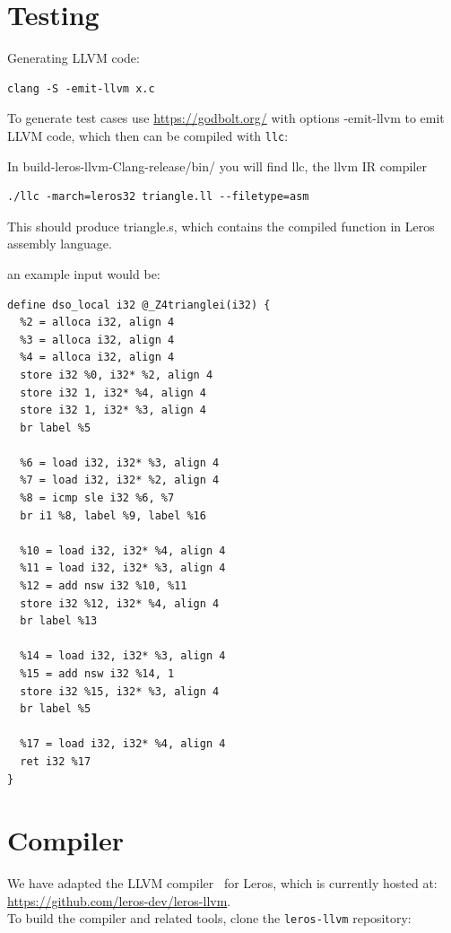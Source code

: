 \documentclass[a4paper,fontsize=10pt,twoside,DIV15,BCOR12mm,headinclude=true,footinclude=false,pagesize,bibtotoc]{scrbook}
\newcommand{\code}[1]{{\small{\texttt{#1}}}}
\begin{document}
\chapter{Testing}

Generating LLVM code:

\begin{verbatim}
clang -S -emit-llvm x.c
\end{verbatim}

To generate test cases use \url{https://godbolt.org/} with options -emit-llvm to emit LLVM code,
which then can be compiled with \code{llc}:

In build-leros-llvm-Clang-release/bin/ you will find llc, the llvm IR compiler

\begin{verbatim}
./llc -march=leros32 triangle.ll --filetype=asm
\end{verbatim}
This should produce triangle.s, which contains the compiled function in Leros assembly language. 

an example input would be:

\begin{verbatim}
define dso_local i32 @_Z4trianglei(i32) {
  %2 = alloca i32, align 4
  %3 = alloca i32, align 4
  %4 = alloca i32, align 4
  store i32 %0, i32* %2, align 4
  store i32 1, i32* %4, align 4
  store i32 1, i32* %3, align 4
  br label %5

  %6 = load i32, i32* %3, align 4
  %7 = load i32, i32* %2, align 4
  %8 = icmp sle i32 %6, %7
  br i1 %8, label %9, label %16

  %10 = load i32, i32* %4, align 4
  %11 = load i32, i32* %3, align 4
  %12 = add nsw i32 %10, %11
  store i32 %12, i32* %4, align 4
  br label %13

  %14 = load i32, i32* %3, align 4
  %15 = add nsw i32 %14, 1
  store i32 %15, i32* %3, align 4
  br label %5

  %17 = load i32, i32* %4, align 4
  ret i32 %17
}
\end{verbatim}

\chapter{Compiler}

We have adapted the LLVM compiler~\cite{llvm:2004} for Leros, which is currently hosted at:
\url{https://github.com/leros-dev/leros-llvm}.\\
To build the compiler and related tools, clone the \texttt{leros-llvm} repository:      
\end{document}
